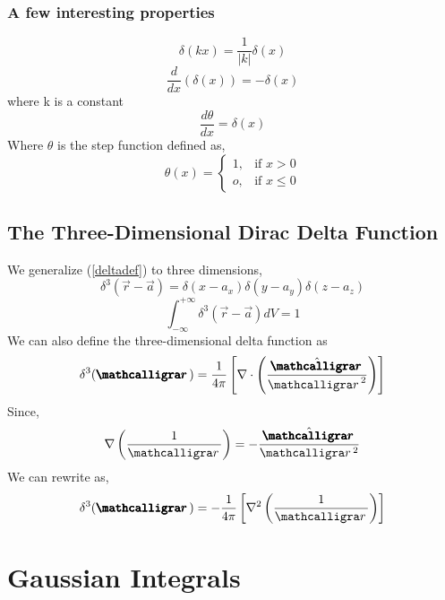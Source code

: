 \subsubsection{A few interesting properties}
\begin{equation}
\delta(kx) = \frac{1}{|k|}\delta(x)
\end{equation}
\begin{equation}
\frac{d}{dx}(\delta(x)) = -\delta(x)
\end{equation}
where k is a constant
\begin{equation}
\frac{d \theta}{dx} = \delta(x)
\end{equation}
Where $\theta$ is the step function defined as,
\begin{equation}
\theta(x)= 
\begin{cases}
1, & \text{if } x > 0\\
o,              & \text{if } x \leq 0
\end{cases}
\end{equation}

\subsection{The Three-Dimensional Dirac Delta Function}
We generalize (\ref{deltadef}) to three dimensions,
\begin{equation}
\delta^{3}(\vec{r} - \vec{a}) = \delta(x-a_{x})\delta(y-a_{y})\delta(z-a_{z})
\end{equation}
\begin{equation}
\int_{- \infty}^{+ \infty} \delta^{3}(\vec{r} - \vec{a}) dV = 1
\end{equation}
We can also define the three-dimensional delta function as
\begin{equation}
\delta^{3}(\boldscriptr) = \frac{1}{4 \pi} \left[\nabla \cdot \left( \frac{\hat{\boldscriptr}}{{\scriptr	}^{2}}\right)\right]
\end{equation}
Since,
$$\nabla \left(\frac{1}{\scriptr}\right) = -\frac{\hat{\boldscriptr}}{\scriptr^{2}}$$
We can rewrite as,
\begin{equation}
\delta^{3}(\boldscriptr) = -\frac{1}{4 \pi} \left[\nabla^{2}  \left( \frac{1}{\scriptr}\right)\right]
\end{equation}
\section{Gaussian Integrals}

